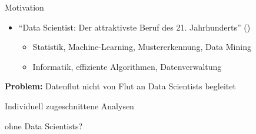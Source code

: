 \documentclass{beamer}
\newcommand{\scite}[1]{ {\scriptsize \textcolor{cgray}{(\cite{#1})}} }
\begin{document}
\begin{frame}[t]{Motivation}
\begin{itemize}
\vspace*{1em}
\item \enquote{Data Scientist: Der attraktivste Beruf des 21. Jahrhunderts} \scite{davenport2012data}\pause
	\begin{itemize}
	\item Statistik, Machine-Learning, Mustererkennung, Data Mining
	\item Informatik, effiziente Algorithmen, Datenverwaltung
	\end{itemize}
\end{itemize}\pause

\vspace*{1em}
\textbf{Problem:} Datenflut nicht von Flut an Data Scientists begleitet\pause

\vspace*{3em}
\begin{center}
{\Large Individuell zugeschnittene Analysen}\hspace*{4em}

{\Large ohne Data Scientists?}\hspace*{4em}
\end{center}

\end{frame}
\end{document}
